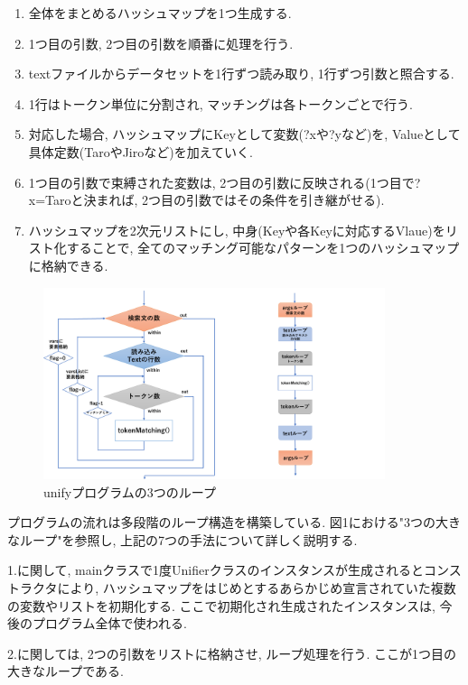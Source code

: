 \documentclass[uplatex,12pt]{jsarticle}
\begin{document}
\begin{enumerate}
\item 全体をまとめるハッシュマップを1つ生成する.
\item 1つ目の引数, 2つ目の引数を順番に処理を行う.
\item textファイルからデータセットを1行ずつ読み取り, 1行ずつ引数と照合する.
\item 1行はトークン単位に分割され, マッチングは各トークンごとで行う.
\item 対応した場合, ハッシュマップにKeyとして変数(?xや?yなど)を, Valueとして具体定数(TaroやJiroなど)を加えていく.
\item 1つ目の引数で束縛された変数は, 2つ目の引数に反映される(1つ目で?x=Taroと決まれば, 2つ目の引数ではその条件を引き継がせる).
\item ハッシュマップを2次元リストにし, 中身(Keyや各Keyに対応するVlaue)をリスト化することで, 全てのマッチング可能なパターンを1つのハッシュマップに格納できる.
\end{enumerate}

\begin{figure}[htbp]
 \begin{center}
  \includegraphics[width = 10cm, pagebox = cropbox, clip]{unify構造.pdf}
 \end{center}
 \caption[]{unifyプログラムの3つのループ}\label{fig:fig1.1}
\end{figure}

プログラムの流れは多段階のループ構造を構築している. 図1における"3つの大きなループ"を参照し, 上記の7つの手法について詳しく説明する.

1.に関して, mainクラスで1度Unifierクラスのインスタンスが生成されるとコンストラクタにより, ハッシュマップをはじめとするあらかじめ宣言されていた複数の変数やリストを初期化する. ここで初期化され生成されたインスタンスは, 今後のプログラム全体で使われる.

2.に関しては, 2つの引数をリストに格納させ, ループ処理を行う. ここが1つ目の大きなループである.
\end{document}
